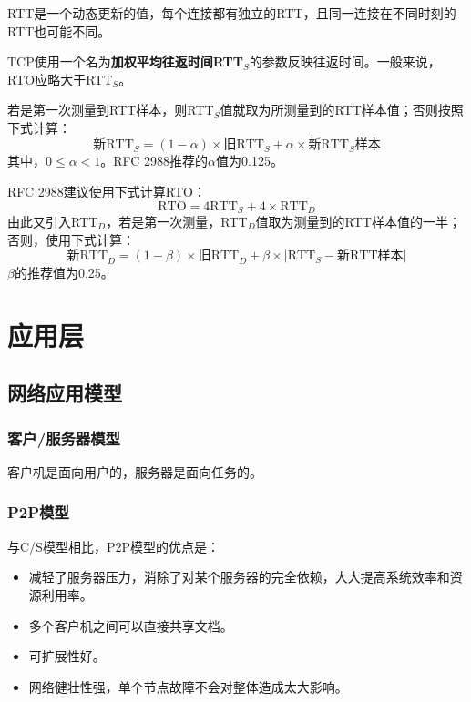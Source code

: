 \documentclass[12pt, a4paper, oneside]{ctexart}
\begin{document}
RTT是一个动态更新的值，每个连接都有独立的RTT，且同一连接在不同时刻的RTT也可能不同。

TCP使用一个名为\textbf{加权平均往返时间RTT$_S$}的参数反映往返时间。一般来说，RTO应略大于RTT$_S$。

若是第一次测量到RTT样本，则RTT$_S$值就取为所测量到的RTT样本值；否则按照下式计算：
\begin{equation*}
    \text{新RTT}_S=(1-\alpha)\times\text{旧RTT}_S+\alpha\times\text{新RTT}_S\text{样本}
\end{equation*}
其中，$0\leq\alpha<1$。RFC 2988推荐的$\alpha$值为0.125。

RFC 2988建议使用下式计算RTO：
\begin{equation*}
    \text{RTO}=4\text{RTT}_S+4\times\text{RTT}_D
\end{equation*}
由此又引入RTT$_D$，若是第一次测量，RTT$_D$值取为测量到的RTT样本值的一半；否则，使用下式计算：
\begin{equation*}
    \text{新RTT}_D=(1-\beta)\times\text{旧RTT}_D+\beta\times\lvert\text{RTT}_S-\text{新RTT样本}\rvert
\end{equation*}
$\beta$的推荐值为0.25。

\section{应用层}

\subsection{网络应用模型}

\subsubsection{客户/服务器模型}

客户机是面向用户的，服务器是面向任务的。

\subsubsection{P2P模型}

与C/S模型相比，P2P模型的优点是：
\begin{itemize}
    \item 减轻了服务器压力，消除了对某个服务器的完全依赖，大大提高系统效率和资源利用率。
    \item 多个客户机之间可以直接共享文档。
    \item 可扩展性好。
    \item 网络健壮性强，单个节点故障不会对整体造成太大影响。
\end{itemize}
\end{document}
